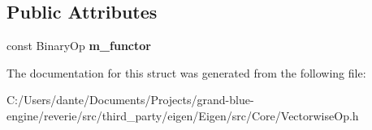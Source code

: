 \subsection*{Public Attributes}
\begin{DoxyCompactItemize}
\item 
\mbox{\label{struct_eigen_1_1internal_1_1member__redux_ae7fc03a21a3cafa6cd4698f894fb390f}} 
const Binary\+Op {\bfseries m\+\_\+functor}
\end{DoxyCompactItemize}


The documentation for this struct was generated from the following file\+:\begin{DoxyCompactItemize}
\item 
C\+:/\+Users/dante/\+Documents/\+Projects/grand-\/blue-\/engine/reverie/src/third\+\_\+party/eigen/\+Eigen/src/\+Core/Vectorwise\+Op.\+h\end{DoxyCompactItemize}
